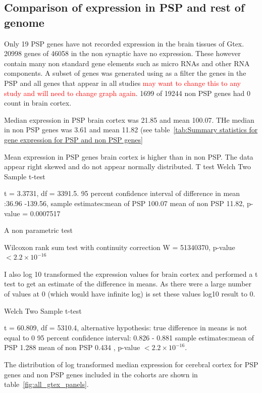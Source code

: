 
\subsection{Comparison of expression in PSP and rest of genome}
Only 19 PSP genes have not recorded expression in the brain tissues of Gtex. 20998 genes of 46058 in the non synaptic have no expression. These however contain many non standard gene elements such as micro RNAs and other RNA components. A subset of genes was generated using as a filter the genes in the PSP and all genes that appear in all studies  \textcolor{red}{may want to change this to any study and will need to change graph again}. 1699 of 19244 non PSP genes had 0 count in brain cortex.



Median expression in PSP brain cortex was 21.85 and mean 100.07. THe median in non PSP genes was 3.61 and mean 11.82 (see table~\ref{tab:Summary statistics for gene expression for PSP and non PSP genes}

Mean expression in PSP genes brain cortex is higher than in non PSP. The data appear right skewed and do not appear normally distributed. T test 	Welch Two Sample t-test


t = 3.3731, df = 3391.5. 95 percent confidence interval of difference in mean :36.96 -139.56, sample estimates:mean of PSP 100.07 mean of non PSP  11.82, p-value = 0.0007517

A non parametric test 

	Wilcoxon rank sum test with continuity correction W = 51340370, p-value $< 2.2 \times 10^{-16}$


I also log 10 transformed the expression values for brain cortex and performed a t test to get an estimate of the difference in means. As there were a large number of values at 0 (which would have infinite log) is set these values log10 result to 0.

	Welch Two Sample t-test

t = 60.809, df = 5310.4, 
alternative hypothesis: true difference in means is not equal to 0
95 percent confidence interval: 0.826 - 0.881
sample estimates:mean of PSP 1.288  mean of non PSP 0.434 , p-value $< 2.2 \times 10^{-16}$. 

The distribution of log transformed median expression for cerebral cortex for PSP genes and non PSP genes included in the cohorts are shown in table~\ref{fig:all_gtex_panels}. 
 
